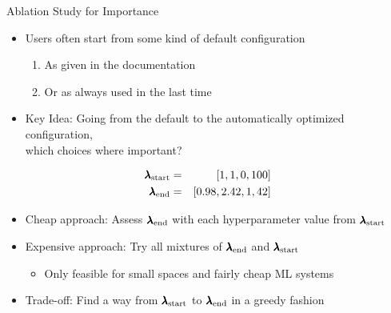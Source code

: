 \begin{frame}[c]{Ablation Study for Importance}

\begin{itemize}
	\item Users often start from some kind of default configuration
	\begin{enumerate}
		\item As given in the documentation 
		\item Or as always used in the last time
	\end{enumerate}
    \pause
	\item \alert{Key Idea}: Going from the default to the automatically optimized configuration,\\
	 which choices where important?
\end{itemize}

\begin{eqnarray}
\pmb{\lambda}_{\text{start}} &=& [1, 1, 0, 100]  \nonumber\\
\pmb{\lambda}_{\text{end}} &=& [0.98, 2.42, 1, 42]  \nonumber
\end{eqnarray}

\pause
\begin{itemize}
	\item Cheap approach: Assess $\pmb{\lambda}_{\text{end}}$ with each hyperparameter value from $\pmb{\lambda}_{\text{start}}$
	\pause
	\item Expensive approach: Try all mixtures of $\pmb{\lambda}_{\text{end}}$ and $\pmb{\lambda}_{\text{start}}$
	\begin{itemize}
		\item  Only feasible for small spaces and fairly cheap ML systems
	\end{itemize}
	\pause
	\item Trade-off: Find a way from $\pmb{\lambda}_{\text{start}}$ to $\pmb{\lambda}_{\text{end}}$ in a greedy fashion 
\end{itemize}

\end{frame}
